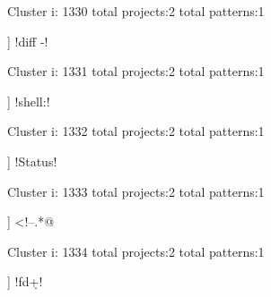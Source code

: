 Cluster i: 1330
total projects:2
total patterns:1
\begin{multicols}{1}
\begin{description}[noitemsep,topsep=0pt]
\item [[2] ] \cverb!diff -!
\end{description}
\end{multicols}







Cluster i: 1331
total projects:2
total patterns:1
\begin{multicols}{1}
\begin{description}[noitemsep,topsep=0pt]
\item [[2] ] \cverb!shell:!
\end{description}
\end{multicols}







Cluster i: 1332
total projects:2
total patterns:1
\begin{multicols}{1}
\begin{description}[noitemsep,topsep=0pt]
\item [[2] ] \cverb!Status!
\end{description}
\end{multicols}







Cluster i: 1333
total projects:2
total patterns:1
\begin{multicols}{1}
\begin{description}[noitemsep,topsep=0pt]
\item [[2] ] \cverb@<!--.*@
\end{description}
\end{multicols}







Cluster i: 1334
total projects:2
total patterns:1
\begin{multicols}{1}
\begin{description}[noitemsep,topsep=0pt]
\item [[2] ] \cverb!fd\d+!
\end{description}
\end{multicols}







